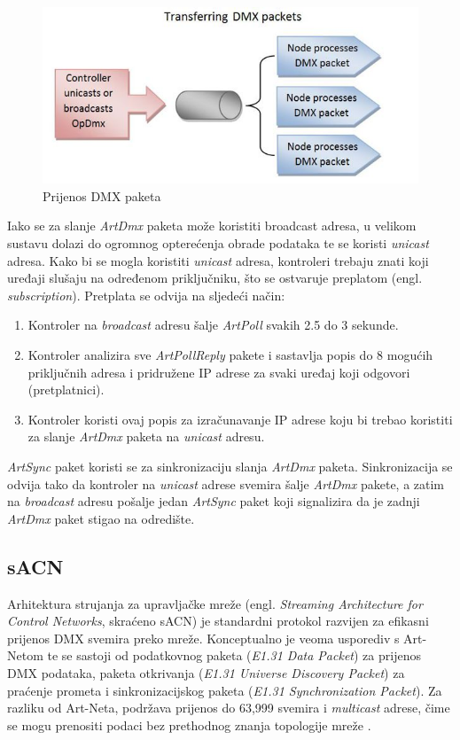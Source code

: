 \documentclass[times, utf8, zavrsni, numeric]{fer}
\begin{document}
\begin{figure}[htp]
	\centering
	\includegraphics[width=\linewidth]{slika 3-4.png}
	\caption{Prijenos DMX paketa \cite{streaming_packets}}
	\label{fig:slika 3-4}
\end{figure}

Iako se za slanje \emph{ArtDmx} paketa može koristiti broadcast adresa, u velikom sustavu dolazi do ogromnog opterećenja obrade podataka te se koristi \emph{unicast} adresa. Kako bi se mogla koristiti \emph{unicast} adresa, kontroleri trebaju znati  koji uređaji slušaju na određenom priključniku, što se ostvaruje preplatom (engl. \emph{subscription}). Pretplata se odvija na sljedeći način: \cite{subscription}

\begin{enumerate}
	\item Kontroler na \emph{broadcast} adresu šalje \emph{ArtPoll} svakih 2.5 do 3 sekunde.
	\item Kontroler analizira sve \emph{ArtPollReply} pakete i sastavlja popis do 8 mogućih priključnih adresa i pridružene IP adrese za svaki uređaj koji odgovori (pretplatnici).
	\item Kontroler koristi ovaj popis za izračunavanje IP adrese koju bi trebao koristiti za slanje \emph{ArtDmx} paketa na \emph{unicast} adresu.
\end{enumerate}

\emph{ArtSync} paket koristi se za sinkronizaciju slanja \emph{ArtDmx} paketa. Sinkronizacija se odvija tako da kontroler na \emph{unicast} adrese svemira šalje \emph{ArtDmx} pakete, a zatim na \emph{broadcast} adresu pošalje jedan \emph{ArtSync} paket koji signalizira da je zadnji \emph{ArtDmx} paket stigao na odredište.

\pagebreak

\subsection{sACN}
Arhitektura strujanja za upravljačke mreže (engl. \emph{Streaming Architecture for Control Networks}, skraćeno sACN) je standardni protokol razvijen za efikasni prijenos DMX svemira preko mreže. Konceptualno je veoma usporediv s Art-Netom te se sastoji od podatkovnog paketa (\emph{E1.31 Data Packet}) za prijenos DMX podataka, paketa otkrivanja (\emph{E1.31 Universe Discovery Packet}) za praćenje prometa i sinkronizacijskog paketa (\emph{E1.31 Synchronization Packet}). Za razliku od Art-Neta, podržava prijenos do 63,999 svemira i \emph{multicast} adrese, čime se mogu prenositi podaci bez prethodnog znanja topologije mreže \cite{sACN}.
\end{document}
